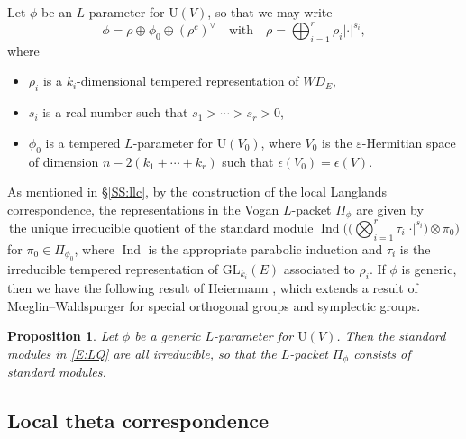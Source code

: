 \documentclass[11pt]{amsart}
\numberwithin{equation}{section}
\theoremstyle{plain}
\newtheorem{prop}[thm]{Proposition}
\theoremstyle{definition}
\theoremstyle{remark}
\def\Ind{\operatorname{Ind}}
\def\GL{\mathrm{GL}}
\def\U{\mathrm{U}}
\def\WD{\mathit{WD}}
\begin{document}
Let $\phi$ be an $L$-parameter for $\U(V)$, so that we may write
\[
 \phi = \rho \oplus \phi_0 \oplus (\rho^c)^{\vee} \quad \text{with} \quad
 \rho = \bigoplus_{i=1}^r \rho_i |\cdot|^{s_i},
\]
where 
\begin{itemize}
 \item $\rho_i$ is a $k_i$-dimensional tempered representation of $\WD_E$,
 \item $s_i$ is a real number such that $s_1 > \cdots > s_r > 0$,
 \item $\phi_0$ is a tempered $L$-parameter for $\U(V_0)$, where $V_0$ is the $\varepsilon$-Hermitian space of dimension $n-2(k_1+\cdots+k_r)$ such that $\epsilon(V_0) = \epsilon(V)$.
\end{itemize}
As mentioned in \S \ref{SS:llc}, by the construction of the local Langlands correspondence, the representations in the Vogan $L$-packet $\Pi_{\phi}$ are given by
\begin{equation}
\label{E:LQ}
 \text{the unique irreducible quotient of the standard module $\Ind \bigl( \bigl( \bigotimes_{i=1}^r \tau_i |\cdot|^{s_i} \bigr) \otimes \pi_0 \bigr)$}
\end{equation}
for $\pi_0 \in \Pi_{\phi_0}$, where $\Ind$ is the appropriate parabolic induction and $\tau_i$ is the irreducible tempered representation of $\GL_{k_i}(E)$ associated to $\rho_i$.
If $\phi$ is generic, then we have the following result of Heiermann \cite{hei}, which extends a result of M{\oe}glin--Waldspurger \cite[Corollaire 2.14]{mw} for special orthogonal groups and symplectic groups.

\begin{prop}
\label{prop:heiermann}
Let $\phi$ be a generic $L$-parameter for $\U(V)$.
Then the standard modules in \eqref{E:LQ} are all irreducible,
so that the $L$-packet $\Pi_{\phi}$ consists of standard modules.
\end{prop}

\subsection{Local theta correspondence}
\end{document}
